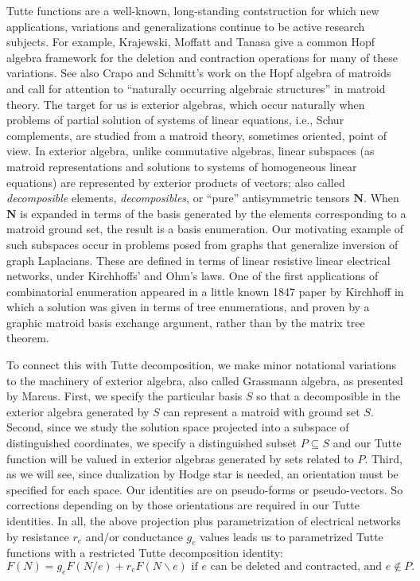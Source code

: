 \documentclass[Unicode]{cedram-alco}
\newcommand{\ext}[1]{\ensuremath{\mathbf{#1}}}
\begin{document}
\newpage




Tutte functions are a well-known, long-standing contstruction
for which new applications, variations and generalizations
continue to be active research subjects. For example,
Krajewski, Moffatt and Tanasa give a common Hopf algebra framework
for the deletion and contraction operations for many of
these variations\cite{KRAJEWSKI2018271}.
See also Crapo and Schmitt's work
on the Hopf algebra of matroids and call
for attention to ``naturally occurring algebraic
structures'' in matroid theory\cite{CRAPO20051066}.  The target for us
is exterior algebras, which occur naturally when problems of
partial solution of systems of linear equations\cite{ExteriorAlgInLinalgRef},
i.e., Schur complements,
are studied from a matroid theory, sometimes oriented, point of view.
In exterior algebra, unlike commutative algebras,
linear subspaces (as matroid representations and
solutions to systems of homogeneous linear equations)
are represented by exterior products of vectors; also called
\emph{decomposible} elements, \emph{decomposibles},
or ``pure'' antisymmetric tensors $\ext{N}$.
When $\ext{N}$ is expanded in terms of the basis
generated by the elements corresponding to a matroid
ground set, the result is a basis enumeration.
Our motivating example of such subspaces occur
in problems posed from graphs that generalize inversion
of graph Laplacians.  These are defined in
terms of linear resistive linear electrical networks,
under Kirchhoffs' and Ohm's laws.  One of the
first applications of combinatorial enumeration
appeared in a little known 1847 paper by Kirchhoff\cite{Kirchhoff}
in which a solution was given in terms of tree enumerations,
and proven by a graphic matroid basis exchange argument, rather
than by the matrix tree theorem.

To connect this with Tutte decomposition, we make
minor notational variations to the machinery of exterior algebra,
also called Grassmann algebra,
as presented by Marcus\cite{MarcusFDMuAlPt2}.  First, we specify the particular basis $S$
so that a decomposible in the exterior algebra generated by $S$
can represent a matroid with ground set $S$.
Second, since we study the solution space projected
into a subspace of distinguished coordinates, we
specify a distinguished subset $P\subseteq S$
and our Tutte function will be valued in exterior algebras generated by sets related to $P$.
Third, as we will see, since dualization by Hodge star is needed,
an orientation must be specified for each space.
Our identities are on pseudo-forms or pseudo-vectors\cite{Frankel}.
So corrections depending on by those orientations
are required in our Tutte identities.  In all, the above projection plus
parametrization of
electrical networks by resistance $r_e$ and/or conductance $g_e$ values
leads us to parametrized Tutte functions with a
restricted Tutte decomposition identity:
\begin{equation}\label{ParamTutteEqGeneric}
   F(N) = g_eF(N/e)+r_eF(N\backslash e) \text{ if\ }e\text{ can be deleted and contracted, and }e\not\in P.
\end{equation}
\end{document}
